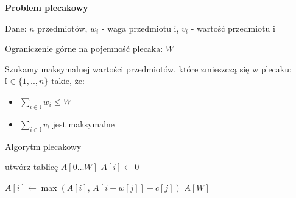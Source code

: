 \documentclass{article}
\begin{document}
    \vspace{1\baselineskip}
    \textbf{Problem plecakowy} \par
    Dane: $n$ przedmiotów, $w_i$ - waga przedmiotu i, $v_i$ - wartość przedmiotu i \par
    Ograniczenie górne na pojemność plecaka: $W$ \par
    Szukamy maksymalnej wartości przedmiotów, które zmieszczą się w plecaku: 
    $\mathbb{I} \in \{1, .., n\}$ takie, że:
    \begin{itemize}
        \item $\sum_{i \in \mathbb{I}} w_i \leq W$
        \item $\sum_{i \in \mathbb{I}} v_i$ jest maksymalne
    \end{itemize}
    \begin{algorithm}[H]
        \caption{Algorytm plecakowy}\label{alg:knapsack}
        \begin{algorithmic}[1]
                \State $\text{utwórz tablicę } A[0 \dots W]$
                    \State $A[i] \gets 0$
                \EndFor
    
                            \State $A[i] \gets \max\left(A[i],\, A[i - w[j]] + c[j]\right)$
                        \EndIf
                    \EndFor
                \EndFor
                \State \Return $A[W]$
            \EndProcedure
        \end{algorithmic}
    \end{algorithm}
    
    
    
    
\end{document}
